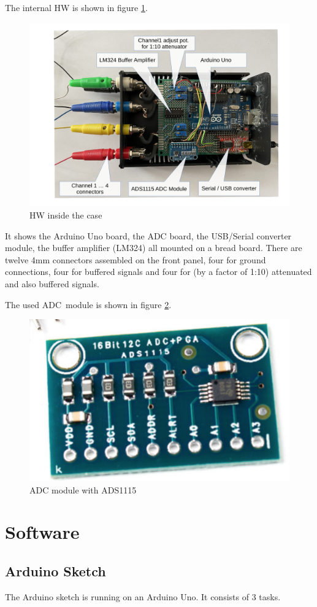 \documentclass[11pt, oneside]{scrartcl}   	%
\begin{document}
The internal HW is shown in figure \ref{fig:HWInternals}.
\begin{figure}[htbp]
	\centering
	\includegraphics[width=0.85\linewidth]{Figures/HWInternals1.pdf}
	\caption{HW inside the case}
	\label{fig:HWInternals}
\end{figure}
It shows the Arduino Uno board, the ADC board, the USB/Serial converter module, the buffer amplifier (LM324) all mounted on a bread board.
There are twelve 4mm connectors assembled on the front panel, four for ground connections, four for buffered signals and four for (by a factor of 1:10) 
attenuated and also buffered signals.

The used ADC module is shown in figure \ref{fig:ADCModule}.
\begin{figure}[htbp]
	\centering
	\includegraphics[width=0.5\linewidth]{Figures/ADS1115ADCBoard.png}
	\caption{ADC module with ADS1115}
	\label{fig:ADCModule}
\end{figure}

\newpage
\section{Software}
\subsection{Arduino Sketch}
The Arduino sketch is running on an Arduino Uno. It consists of 3 tasks.
\end{document}
